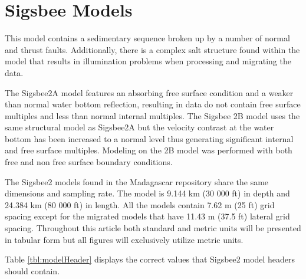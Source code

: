 {
\tiny

\normalsize
}

\section{Sigsbee Models}
This model contains a sedimentary sequence broken up by a number of normal and thrust faults.  Additionally, there is a complex 
salt structure found within the model that results in illumination problems when processing and migrating the data.   

The Sigsbee2A model features an absorbing free surface condition and a weaker than normal water bottom reflection, 
resulting in data do not contain free surface multiples and less than normal internal multiples.  
The Sigsbee 2B model uses the same structural model as Sigsbee2A but the velocity contrast at the water bottom has been 
increased to a normal level thus generating significant internal and free surface multiples. Modeling on the 2B model was 
performed with both free and non free surface boundary conditions.

The Sigsbee2 models found in the Madagascar repository share the same dimensions and sampling rate.  The model is 9.144 km (30 000 ft) in 
depth and 24.384 km (80 000 ft) in length.  All the models contain 7.62 m (25 ft) grid spacing except for the migrated models that have
11.43 m (37.5 ft) lateral grid spacing.  Throughout this article both standard and metric units will be presented in tabular form but all
figures will exclusively utilize metric units.   

Table \ref{tbl:modelHeader} displays the correct values that Sigsbee2 model headers should contain.   

